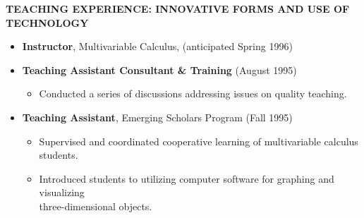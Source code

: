 \vspace {.16in}

 {\bf \hspace{-0.29in}  TEACHING EXPERIENCE: INNOVATIVE FORMS AND USE OF TECHNOLOGY}
\vspace{-.001in}
\begin{itemize}
\item \vspace{-0.099in} {\bf Instructor}, Multivariable Calculus, (anticipated Spring 1996) 
\item \vspace{-0.099in} {\bf Teaching Assistant Consultant \&  Training} (August 1995)
\begin{itemize}
\vspace{-.1in}
\item Conducted a series of discussions addressing issues on quality teaching.

\end{itemize} 
\item \vspace{-0.099in} {\bf Teaching Assistant}, Emerging Scholars Program (Fall 1995) 
\begin{itemize}
\vspace{-.1in}
\item Supervised and coordinated cooperative learning of multivariable calculus students.
\vspace{-0.077in}
\item Introduced students to utilizing computer software for graphing  and visualizing   \\ three-dimensional objects.

\end{itemize} 




\end{itemize}
